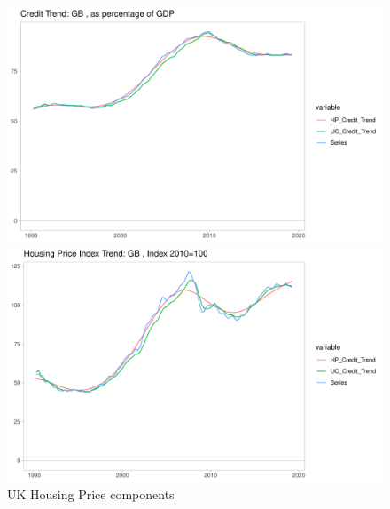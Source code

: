 \documentclass[fleqn]{article}
\begin{document}
\begin{outline}[enumerate]
\begin{figure}[h!]
	\caption{UK Housing Price components}	
	\centerline{\includegraphics[scale=0.7]{../Output/Graphs/Credit_trend_GB.pdf}}
	\centerline{\includegraphics[scale=0.7]{../Output/Graphs/HP_trend_GB.pdf}}
\end{figure}


\end{outline}
\end{document}
